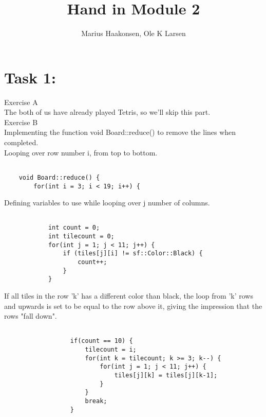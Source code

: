\documentclass[11pt]{amsart}
\title{Hand in Module 2}
\author{Marius Haakonsen, Ole K Larsen}
\begin{document}
\maketitle

\section{Task 1:}

Exercise A  \\
The both of us have already played Tetris, so we'll skip this part.  \\

Exercise B \\

Implementing the function void Board::reduce() to remove the lines when completed. \\

Looping over row number i, from top to bottom. \\
\begin{verbatim}

	void Board::reduce() {
	    for(int i = 3; i < 19; i++) {

\end{verbatim}

Defining variables to use while looping over j number of columns. \\
\begin{verbatim}

	        int count = 0;
	        int tilecount = 0;
	        for(int j = 1; j < 11; j++) {
	            if (tiles[j][i] != sf::Color::Black) {
	                count++;
	            }
	        }

\end{verbatim}


If all tiles in the row 'k' has a different color than black, the loop from 'k' rows and upwards is set to be equal to the row above it, giving the impression that the rows "fall down". \\
\begin{verbatim}

	              if(count == 10) {
	                  tilecount = i;
	                  for(int k = tilecount; k >= 3; k--) {
	                      for(int j = 1; j < 11; j++) {
	                          tiles[j][k] = tiles[j][k-1];
	                      }
	                  }
	                  break;
	              }

\end{verbatim}
\end{document}
